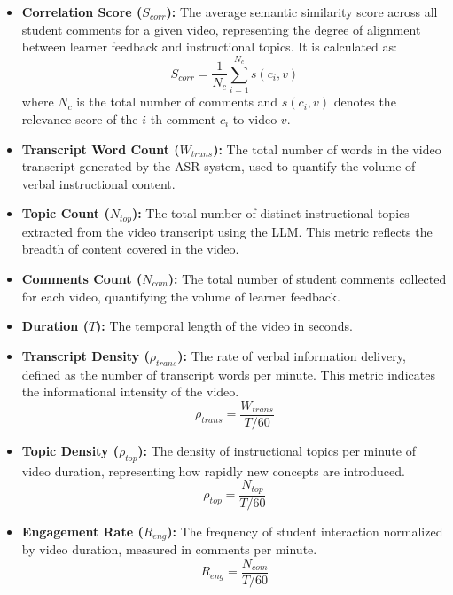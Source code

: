 \begin{itemize}
    \item \textbf{Correlation Score ($S_{corr}$):} The average semantic similarity score across all student comments for a given video, representing the degree of alignment between learner feedback and instructional topics. It is calculated as:
    \begin{equation}
        S_{corr} = \frac{1}{N_c} \sum_{i=1}^{N_c} s(c_i, v)
    \end{equation}
    where $N_c$ is the total number of comments and $s(c_i, v)$ denotes the relevance score of the $i$-th comment $c_i$ to video $v$.

    \item \textbf{Transcript Word Count ($W_{trans}$):} The total number of words in the video transcript generated by the ASR system, used to quantify the volume of verbal instructional content.

    \item \textbf{Topic Count ($N_{top}$):} The total number of distinct instructional topics extracted from the video transcript using the LLM. This metric reflects the breadth of content covered in the video.

    \item \textbf{Comments Count ($N_{com}$):} The total number of student comments collected for each video, quantifying the volume of learner feedback.

    \item \textbf{Duration ($T$):} The temporal length of the video in seconds.

    \item \textbf{Transcript Density ($\rho_{trans}$):} The rate of verbal information delivery, defined as the number of transcript words per minute. This metric indicates the informational intensity of the video.
    \begin{equation}
        \rho_{trans} = \frac{W_{trans}}{T / 60}
    \end{equation}

    \item \textbf{Topic Density ($\rho_{top}$):} The density of instructional topics per minute of video duration, representing how rapidly new concepts are introduced.
    \begin{equation}
        \rho_{top} = \frac{N_{top}}{T / 60}
    \end{equation}

    \item \textbf{Engagement Rate ($R_{eng}$):} The frequency of student interaction normalized by video duration, measured in comments per minute.
    \begin{equation}
        R_{eng} = \frac{N_{com}}{T / 60}
    \end{equation}


\end{itemize}
